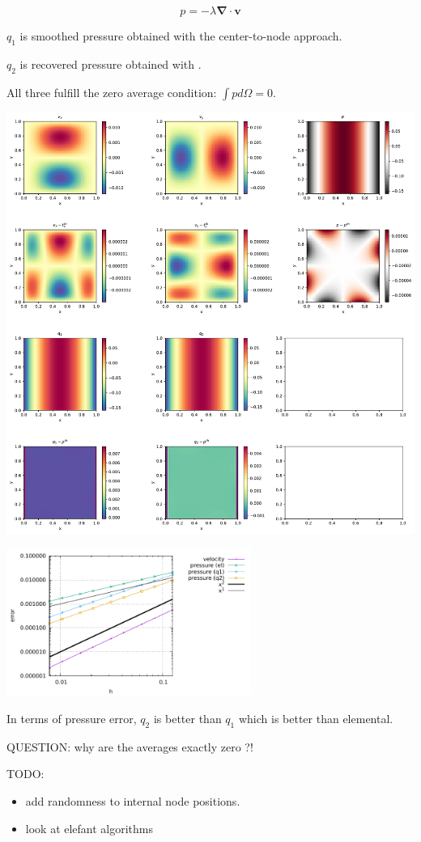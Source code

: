 

\[
p = -\lambda {\bm \nabla}\cdot {\bm v}
\]

$q_1$ is smoothed pressure obtained with the  center-to-node approach.

$q_2$ is recovered pressure obtained with \cite{zina82}.

All three fulfill the zero average condition: $\int p d\Omega = 0$.

\includegraphics[width=15cm]{python_codes/fieldstone_consistent_pressure_recovery/solution}

\includegraphics[width=8cm]{python_codes/fieldstone_consistent_pressure_recovery/errors}

In terms of pressure error, $q_2$ is better than $q_1$ which is better than elemental.

QUESTION: why are the averages exactly zero ?!

TODO: 
\begin{itemize}
\item add randomness to internal node positions.
\item look at elefant algorithms
\end{itemize}
